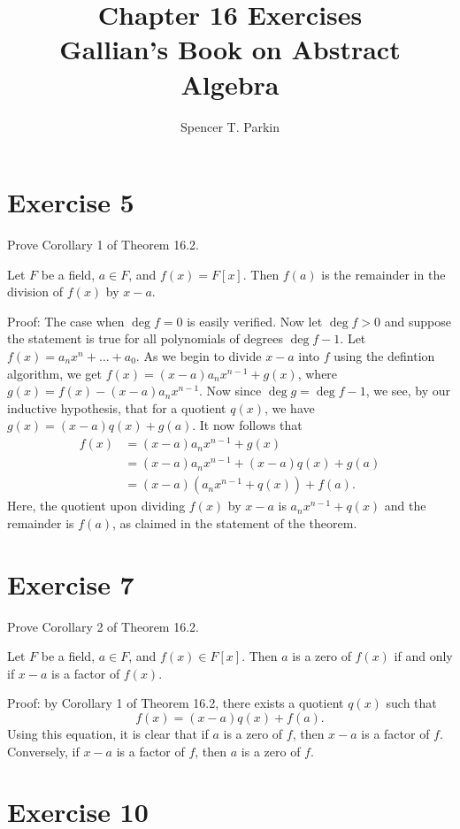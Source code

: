 \documentclass[12pt]{article}
\title{Chapter 16 Exercises\\Gallian's Book on Abstract Algebra}
\author{Spencer T. Parkin}
\begin{document}
\maketitle

\section*{Exercise 5}

Prove Corollary 1 of Theorem 16.2.

Let $F$ be a field, $a\in F$, and $f(x)=F[x]$.  Then $f(a)$
is the remainder in the division of $f(x)$ by $x-a$.

Proof: The case when $\deg f=0$ is easily verified.
Now let $\deg f>0$ and suppose the statement is
true for all polynomials of degrees $\deg f - 1$.
Let $f(x)=a_nx^n+\dots+a_0$.  As we begin
to divide $x-a$ into $f$ using the defintion algorithm,
we get $f(x)=(x-a)a_nx^{n-1}+g(x)$,
where $g(x)=f(x)-(x-a)a_nx^{n-1}$.
Now since $\deg g = \deg f - 1$, we see, by our
inductive hypothesis, that for a quotient $q(x)$,
we have $g(x)=(x-a)q(x)+g(a)$.
It now follows that
\begin{align*}
f(x)&=(x-a)a_nx^{n-1}+g(x) \\
 &= (x-a)a_nx^{n-1}+(x-a)q(x)+g(a) \\
 &= (x-a)(a_nx^{n-1}+q(x))+f(a).
\end{align*}
Here, the quotient upon dividing $f(x)$ by $x-a$
is $a_nx^{n-1}+q(x)$ and the remainder is $f(a)$,
as claimed in the statement of the theorem.

\section*{Exercise 7}

Prove Corollary 2 of Theorem 16.2.

Let $F$ be a field, $a\in F$, and $f(x)\in F[x]$.  Then $a$ is a zero
of $f(x)$ if and only if $x-a$ is a factor of $f(x)$.

Proof: by Corollary 1 of Theorem 16.2, there exists
a quotient $q(x)$ such that
\begin{equation*}
f(x) = (x-a)q(x) + f(a).
\end{equation*}
Using this equation, it is clear that if $a$ is a zero
of $f$, then $x-a$ is a factor of $f$.  Conversely,
if $x-a$ is a factor of $f$, then $a$ is a zero of $f$.

\section*{Exercise 10}
\end{document}
